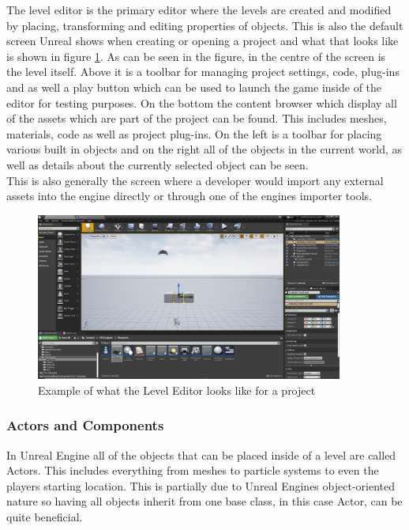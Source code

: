The level editor is the primary editor where the levels are created and modified by placing, transforming and editing properties of objects. This is also the default screen Unreal shows when creating or opening a project and what that looks like is shown in figure \ref{fig:LevelEditor}. As can be seen in the figure, in the centre of the screen is the level itself. Above it is a toolbar for managing project settings, code, plug-ins and as well a play button which can be used to launch the game inside of the editor for testing purposes. On the bottom the content browser which display all of the assets which are part of the project can be found. This includes meshes, materials, code as well as project plug-ins. On the left is a toolbar for placing various built in objects and on the right all of the objects in the current world, as well as details about the currently selected object can be seen.\\
This is also generally the screen where a developer would import any external assets into the engine directly or through one of the engines importer tools.\\

\begin{figure}[htpb]
	\centering
	\includegraphics[width=0.9\textwidth]{fig/UnrealEngineLevelEditor.png}
	\caption[Unreal Engine Level Editor]{Example of what the Level Editor looks like for a project \protect}
	\label{fig:LevelEditor}
\end{figure}

\subsubsection{Actors and Components}

In Unreal Engine all of the objects that can be placed inside of a level are called Actors. This includes everything from meshes to particle systems to even the players starting location. This is partially due to Unreal Engines object-oriented nature so having all objects inherit from one base class, in this case Actor, can be quite beneficial.

